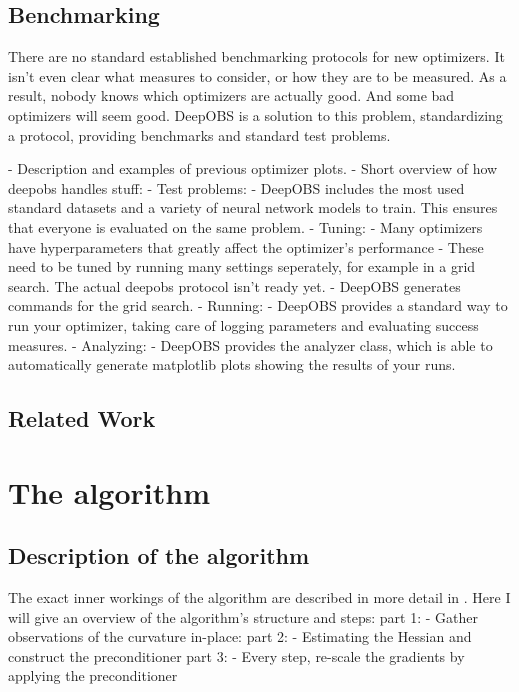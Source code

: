 \documentclass[twoside,12pt,a4paper]{report}
\begin{document}
\section{Benchmarking}
\begin{markdown}
There are no standard established benchmarking protocols for new optimizers. It isn't even clear what measures to consider, or how they are to be measured. As a result, nobody knows which optimizers are actually good. And some bad optimizers will seem good.
DeepOBS is a solution to this problem, standardizing a protocol, providing benchmarks and standard test problems.

- Description and examples of previous optimizer plots.
- Short overview of how deepobs handles stuff:
    - Test problems:
      	- DeepOBS includes the most used standard datasets and a variety of neural network models to train. This ensures that everyone is evaluated on the same problem.
    - Tuning:
    	- Many optimizers have hyperparameters that greatly affect the optimizer's performance
 	    - These need to be tuned by running many settings seperately, for example in a grid search. The actual deepobs protocol isn't ready yet.
      - DeepOBS generates commands for the grid search.
    - Running:
      	- DeepOBS provides a standard way to run your optimizer, taking care of logging parameters and evaluating success measures.
    - Analyzing:
      	- DeepOBS provides the analyzer class, which is able to automatically generate matplotlib plots showing the results of your runs.
\end{markdown}

\section{Related Work}


\chapter{The algorithm}
\section{Description of the algorithm}
The exact inner workings of the algorithm are described in more detail in \cite{de2019active}.
Here I will give an overview of the algorithm's structure and steps:
part 1: - Gather observations of the curvature in-place:
part 2: - Estimating the Hessian and construct the preconditioner
part 3: - Every step, re-scale the gradients by applying the preconditioner
\end{document}
